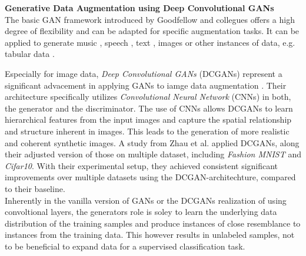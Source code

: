 \noindent\textbf{Generative Data Augmentation using Deep Convolutional GANs}\label{dcgans_data_augmentation} \\
The basic GAN framework introduced by Goodfellow and collegues offers a high degree of flexibility and can be adapted for specific augmentation tasks. It can be applied to generate music \cite{dong2017museganmultitracksequentialgenerative}, speech \cite{li2022ttsgantransformerbasedtimeseriesgenerative}, text \cite{yu2017seqgansequencegenerativeadversarial}, images \cite{goodfellow2014generativeadversarialnetworks} or other instances of data, e.g. tabular data \cite{xu2019modelingtabulardatausing}.

Especially for image data, \textit{Deep Convolutional GANs} (DCGANs) represent a significant advacement in applying GANs to iamge data augmentation \cite{huang2022tutorial}. Their architecture specifically utilizes \textit{Convolutional Neural Network} (CNNs) \cite{LeCun1989firstcnnpaper} in both, the generator and the discriminator. The use of CNNs allows DCGANs to learn hierarchical features from the input images and capture the spatial relationship and structure inherent in images. This leads to the generation of more realistic and coherent synthetic images. A study from Zhau et al. \cite{zhao2023gan} applied DCGANs, along their adjusted version of those on multiple dataset, including \textit{Fashion MNIST} and \textit{Cifar10}. With their experimental setup, they achieved consistent significant improvements over multiple datasets using the DCGAN-architechture, compared to their baseline. \\



Inherently in the vanilla version of GANs or the DCGANs realization of using convoltional layers, the generators role is soley to learn the underlying data distribution of the training samples and produce instances of close resemblance to instances from the training data. This however results in unlabeled samples, not to be beneficial to expand data for a supervised classification task.

